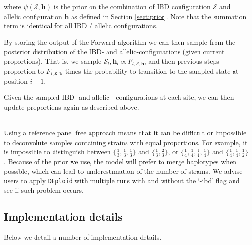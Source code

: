 \documentclass[9pt]{article}
\begin{document}
\noindent where $\psi(\mathcal{S},\mathbf{h})$ is the prior on the combination of IBD configuration $\mathcal{S}$ and allelic configuration $\mathbf{h}$ as defined in Section \ref{sect:prior}.  Note that the summation term is identical for all IBD / allelic configurations.

By storing the output of the Forward algorithm we can then sample from the posterior distribution of the IBD- and allelic-configurations (given current proportions).  That is, we sample $\mathcal{S}_l,\mathbf{h}_l \propto F_{l,\mathcal{S}, \mathbf{h}}$, and then previous steps proportion to $F_{i,\mathcal{S}, \mathbf{h}}$ times the probability to transition to the sampled state at position $i+1$.

Given the sampled IBD- and allelic - configurations at each site, we can then update proportions again as described above.

\vspace{.2cm}

\\
Using a reference panel free approach means that it can be difficult or impossible to deconvolute samples containing strains with equal proportions. For example, it is impossible to distinguish between $\{\frac{1}{3},\frac{1}{3},\frac{1}{3}\}$ and $\{\frac{1}{3},\frac{2}{3}\}$, or
$\{\frac{1}{4},\frac{1}{4}, \frac{1}{4}, \frac{1}{4}\}$ and $\{\frac{1}{4},\frac{1}{4}, \frac{1}{2}\}$. Because of the prior we use, the model will prefer to merge haplotypes when possible, which can lead to underestimation of the number of strains. We advise users to apply {\tt DEploid} with multiple runs with and without the `-ibd' flag and see if such problem occurs.







\subsection{Implementation details}

Below we detail a number of implementation details.
\end{document}
